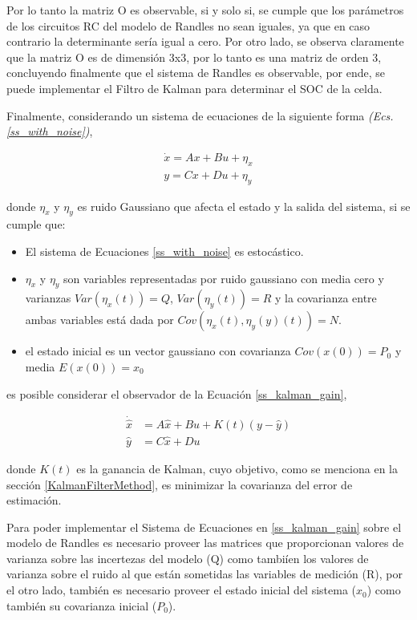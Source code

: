 \documentclass[10pt, a4paper]{article}
\begin{document}
Por lo tanto la matriz O es observable, si y solo si, se cumple que los
par\'ametros de los circuitos RC del modelo de Randles no sean iguales, ya que
en caso contrario la determinante ser\'ia igual a cero. Por otro lado, se observa
claramente que la matriz O es de dimensi\'on 3x3, por lo tanto es una matriz de
orden 3, concluyendo finalmente que el sistema de Randles es observable, por 
ende, se puede implementar el Filtro de Kalman para determinar el \acrshort{SOC} 
de la celda.

Finalmente, considerando un sistema de ecuaciones de la siguiente forma \emph{(Ecs.
\ref{ss_with_noise})},

\begin{align}
    \dot{x} = Ax + Bu + \eta_x\nonumber\\
    y = Cx + Du + \eta_y\label{ss_with_noise}
\end{align}

donde $\eta_x$ y $\eta_y$ es ruido Gaussiano que afecta el estado y la salida
del sistema, si se cumple que:

\begin{itemize}
    \item El sistema de Ecuaciones \ref{ss_with_noise} es estoc\'astico.
    \item $\eta_x$ y $\eta_y$ son variables representadas por ruido gaussiano
        con media cero y varianzas $Var\left(\eta_x(t)\right) = Q$,
        $Var\left(\eta_y(t)\right) = R$ y la covarianza entre ambas variables
        est\'a dada por $Cov\left(\eta_x(t), \eta_y(y)(t)\right) = N$.
    \item el estado inicial es un vector gaussiano con covarianza
        $Cov\left(x(0)\right) = P_0$ y media $E\left(x(0)\right) = x_0$
\end{itemize}

es posible considerar el observador de la Ecuaci\'on \ref{ss_kalman_gain},

\begin{align}
    \dot{\hat{x}} &= A\hat{x} + Bu + K(t)(y - \hat{y})\nonumber\\
    \hat{y} &= C\hat{x} + Du \label{ss_kalman_gain}
\end{align}

donde $K(t)$ es la ganancia de Kalman, cuyo objetivo, como se menciona en la
secci\'on \ref{KalmanFilterMethod}, es minimizar la covarianza del error de
estimaci\'on. 

\newpage

Para poder implementar el Sistema de Ecuaciones en \ref{ss_kalman_gain} sobre
el modelo de Randles es necesario proveer las matrices que proporcionan valores 
de varianza sobre las incertezas del modelo (Q) como tambi\'ien los valores de
varianza sobre el ruido al que est\'an sometidas las variables de medici\'on
(R), por el otro lado, tambi\'en es necesario proveer el estado inicial del
sistema ($x_0$) como tambi\'en su covarianza inicial ($P_0$).
\end{document}
